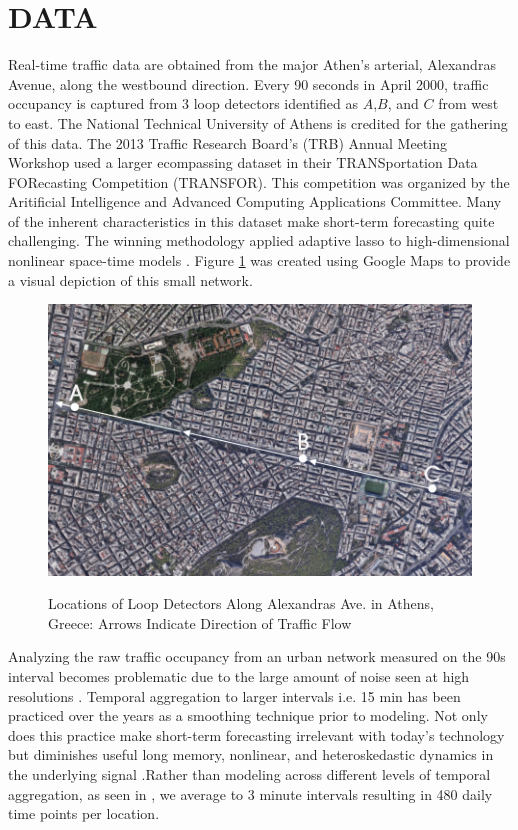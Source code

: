 \section{DATA}
Real-time traffic data are obtained from the major Athen's arterial, Alexandras Avenue, along the westbound direction. Every 90 seconds in April 2000, traffic occupancy is captured from 3 loop detectors identified as $A$,$B$, and $C$ from west to east.  The National Technical University of Athens is credited for the gathering of this data. The 2013 Traffic Research Board's (TRB) Annual Meeting Workshop used a larger ecompassing dataset in their TRANSportation Data FORecasting Competition (TRANSFOR). This competition was organized by the Aritificial Intelligence and Advanced Computing Applications Committee.  Many of the inherent characteristics in this dataset make short-term forecasting quite challenging. The winning methodology applied adaptive lasso to high-dimensional nonlinear space-time models \citep{Kamarianakis2012}.   Figure \ref{fig:trafficdatamap} was created using Google Maps to provide a visual depiction of this small network.

\begin{figure}[!h]
\caption{Locations of Loop Detectors Along Alexandras Ave. in Athens, Greece: Arrows Indicate Direction of Traffic Flow}
\includegraphics[width=\textwidth]{TrafficMap}
\label{fig:trafficdatamap}
\end{figure}

Analyzing the raw traffic occupancy from an urban network measured on the 90s interval becomes problematic due to the large amount of noise seen at high resolutions \citep{Vlahogianni2014}. Temporal aggregation to larger intervals i.e. 15 min has been practiced over the years as a smoothing technique prior to modeling. Not only does this practice make short-term forecasting irrelevant with today's technology but diminishes useful long memory, nonlinear, and heteroskedastic dynamics in the underlying signal \cite{Vlahogianni2011}.Rather than modeling across different levels of temporal aggregation, as seen in \cite{Shang2006}, we average to 3 minute intervals resulting in 480 daily time points per location. 

